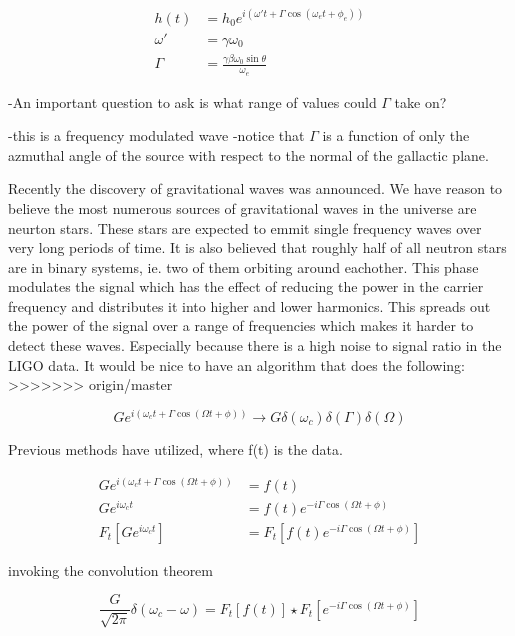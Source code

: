 \documentclass[twocolumn, groupedaddress]{revtex4-1}
\begin{document}
\begin{align}
h(t)    &= h_0 e^{i \left( \omega' t + \Gamma \cos (\omega_e t + \phi_e) \right)}	\\
\omega' &= \gamma \omega_0															\\
\Gamma  &= \frac{\gamma \beta \omega_0 \sin \theta}{\omega_e}
\end{align}

-An important question to ask is what range of values could $\Gamma$ take on?

-this is a frequency modulated wave
-notice that $\Gamma$ is a function of only the azmuthal angle of the source with respect to the normal of the gallactic plane.

Recently the discovery of gravitational waves was announced.  We have reason to believe the most numerous sources of gravitational waves in the universe are neurton stars.  These stars are expected to emmit single frequency waves over very long periods of time.  It is also believed that roughly half of all neutron stars are in binary systems, ie. two of them orbiting around eachother.  This phase modulates the signal which has the effect of reducing the power in the carrier frequency and distributes it into higher and lower harmonics.  This spreads out the power of the signal over a range of frequencies which makes it harder to detect these waves.  Especially because there is a high noise to signal ratio in the LIGO data.  It would be nice to have an algorithm that does the following:
>>>>>>> origin/master

\begin{equation}
G e^{i\left( \omega_c t + \Gamma \cos (\Omega t + \phi ) \right)} \to G \delta (\omega_c) \delta (\Gamma ) \delta (\Omega )
\end{equation}

Previous methods have utilized, where f(t) is the data.

\begin{align}
G e^{i\left( \omega_c t + \Gamma \cos (\Omega t + \phi ) \right)} &= f(t) \\
G e^{i\omega_c t} &= f(t) e^{-i\Gamma \cos (\Omega t + \phi)}			 \\
F_t \left[ G e^{i\omega_c t} \right] &= F_t \left[ f(t) e^{-i\Gamma \cos (\Omega t + \phi)} \right]
\end{align}

invoking the convolution theorem

\begin{equation}
\frac{G}{\sqrt{2\pi}} \delta (\omega_c - \omega) = F_t \left[ f(t) \right] \star F_t \left[ e^{-i\Gamma \cos (\Omega t + \phi)} \right]
\end{equation}
\end{document}

